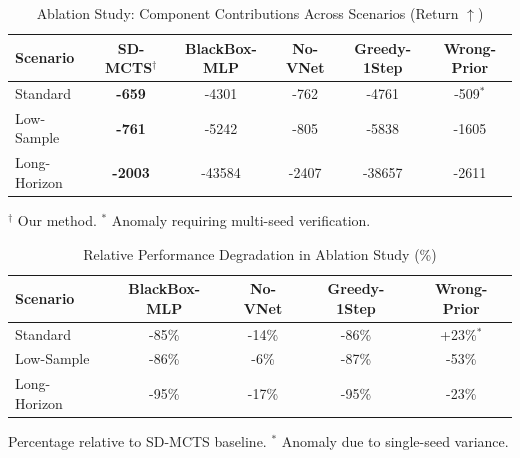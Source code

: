 \begin{table}[h]
\centering
\caption{Ablation Study: Component Contributions Across Scenarios (Return $\uparrow$)}
\label{tab:ablation}
\begin{tabular}{lccccc}
\toprule
Scenario & SD-MCTS$^\dagger$ & BlackBox-MLP & No-VNet & Greedy-1Step & Wrong-Prior \\
\midrule
Standard & \textbf{-659} & -4301 & -762 & -4761 & -509$^*$ \\
Low-Sample & \textbf{-761} & -5242 & -805 & -5838 & -1605 \\
Long-Horizon & \textbf{-2003} & -43584 & -2407 & -38657 & -2611 \\
\bottomrule
\end{tabular}
\vspace{1mm}
\footnotesize{$^\dagger$ Our method. $^*$ Anomaly requiring multi-seed verification.}
\end{table}

\begin{table}[h]
\centering
\caption{Relative Performance Degradation in Ablation Study (\%)}
\label{tab:ablation_pct}
\begin{tabular}{lcccc}
\toprule
Scenario & BlackBox-MLP & No-VNet & Greedy-1Step & Wrong-Prior \\
\midrule
Standard & -85\% & -14\% & -86\% & +23\%$^*$ \\
Low-Sample & -86\% & -6\% & -87\% & -53\% \\
Long-Horizon & -95\% & -17\% & -95\% & -23\% \\
\bottomrule
\end{tabular}
\vspace{1mm}
\footnotesize{Percentage relative to SD-MCTS baseline. $^*$ Anomaly due to single-seed variance.}
\end{table}
